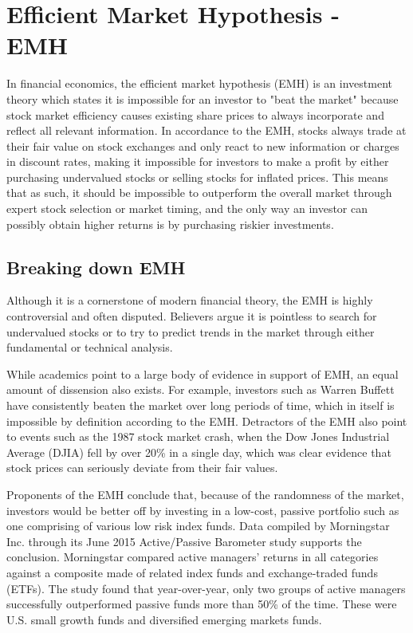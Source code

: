 \section{Efficient Market Hypothesis - EMH}

In financial economics, the efficient market hypothesis (EMH) is an investment theory which states it is impossible for an investor to "beat the market" because stock market efficiency causes existing share prices to always incorporate and reflect all relevant information. In accordance to the EMH, stocks always trade at their fair value on stock exchanges and only react to new information or charges in discount rates, making it impossible for investors to make a profit by either purchasing undervalued stocks or selling stocks for inflated prices. This means that as such, it should be impossible to outperform the overall market through expert stock selection or market timing, and the only way an investor can possibly obtain higher returns is by purchasing riskier investments.

\subsection{Breaking down EMH}
Although it is a cornerstone of modern financial theory, the EMH is highly controversial and often disputed. Believers argue it is pointless to search for undervalued stocks or to try to predict trends in the market through either fundamental or technical analysis.

While academics point to a large body of evidence in support of EMH, an equal amount of dissension also exists. For example, investors such as Warren Buffett have consistently beaten the market over long periods of time, which  in itself is impossible by definition according to the EMH. Detractors of the EMH also point to events such as the 1987 stock market crash, when the Dow Jones Industrial Average (DJIA) fell by over 20\% in a single day, which was clear evidence that stock prices can seriously deviate from their fair values.

Proponents of the EMH conclude that, because of the randomness of the market, investors would be better off by investing in a low-cost, passive portfolio such as one comprising of various low risk index funds. Data compiled by Morningstar Inc. through its June 2015 Active/Passive Barometer study supports the conclusion. Morningstar compared active managers’ returns in all categories against a composite made of related index funds and exchange-traded funds (ETFs). The study found that year-over-year, only two groups of active managers successfully outperformed passive funds more than 50\% of the time. These were U.S. small growth funds and diversified emerging markets funds.


